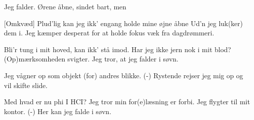 \documentclass[a4paper,11pt]{article}
\begin{document}
\begin{song}
    Jeg falder.
    Ørene åbne, sindet bart, men


  [Omkvæd] Plud'lig kan jeg ikk' engang holde mine øjne åbne
    Ud'n jeg luk(ker) dem i.
    Jeg kæmper desperat for at holde fokus væk
    fra dagdrømmeri.


    Bli'r tung i mit hoved,
    kan ikk' stå imod.
    Har jeg ikke jern nok i mit blod?
    (Op)mærksomheden svigter.
    Jeg tror, at jeg falder i søvn.
 

   Jeg vågner op som objekt (for) andres blikke.
    (-) Rystende rejser jeg mig op og vil skifte slide.

    Med hvad er nu phi
    I HCI?
    Jeg tror min for(e)læsning er forbi.
    Jeg flygter til mit kontor.
    (-) Her kan jeg falde i søvn.



\end{song}
\end{document}
